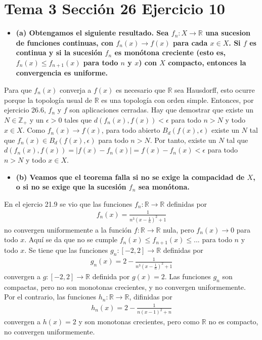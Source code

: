 \documentclass{article}
\begin{document}
\section{Tema 3 Sección 26 Ejercicio 10}
\begin{itemize}
\item \bf (a) \rm Obtengamos el siguiente resultado. Sea $f_n:X\rightarrow \mathbb{R}$ una sucesion de funciones continuas, con $f_n(x)\rightarrow f(x)$ para cada $x\in X$. Si $f$ es continua y si la sucesión $f_n$ es monótona creciente (esto es, $f_n(x)\leq f_{n+1}(x)$ para todo $n$ y $x$) con $X$ compacto, entonces la convergencia es uniforme.
\end{itemize}
Para que $f_n(x)$ converja a $f(x)$ es necesario que $\mathbb{R}$ sea Hausdorff, esto ocurre porque la topología usual de $\mathbb{R}$ es una topología con orden simple. Entonces, por ejercicio 26.6, $f_n$ y $f$ son aplicaciones cerradas. Hay que demostrar que existe un $N\in\mathbb{Z}_+$ y un $\epsilon>0$ tales que $d(f_n(x),f(x))<\epsilon$ para todo $n>N$ y todo $x\in X$. Como $f_n(x)\rightarrow f(x)$, para todo abierto $B_d(f(x),\epsilon )$ existe un $N$ tal que $f_n(x)\in B_d(f(x),\epsilon )$ para todo $n>N$. Por tanto, existe un $N$ tal que $d(f_n(x),f(x))=|f(x)-f_n(x)|=f(x)-f_n(x)<\epsilon$ para todo $n>N$ y todo $x\in X$.
\begin{itemize}
\item \bf (b) \rm Veamos que el teorema falla si no se exige la compacidad de $X$, o si no se exige que la sucesión $f_n$ sea monótona.
\end{itemize}
En el ejercio 21.9 se vio que las funciones $f_n:\mathbb{R}\rightarrow\mathbb{R}$ definidas por
\begin{eqnarray}
f_n(x)=\frac{1}{n^3\left(x-\frac{1}{n}\right)^2+1}
\end{eqnarray}
no convergen uniformemente a la función $f:\mathbb{R}\rightarrow\mathbb{R}$ nula, pero $f_n(x)\rightarrow 0$ para todo $x$. Aquí se da que no se cumple $f_n(x)\leq f_{n+1}(x)\leq ...$ para todo $n$ y todo $x$. Se tiene que las funciones $g_n:[-2,2]\rightarrow \mathbb{R}$ definidas por 
\begin{eqnarray}
g_n(x)=2-
\frac{1}{n^3\left(x-\frac{1}{n}\right)^2+1}\nonumber
\end{eqnarray}
convergen a $g:[-2,2]\rightarrow\mathbb{R}$ definida por $g(x)=2$. Las funciones $g_n$ son compactas, pero no son monotonas crecientes, y no convergen uniformemente. Por el contrario, las funciones $h_n:\mathbb{R}\rightarrow\mathbb{R}$, difinidas por 
\begin{eqnarray}
h_n(x)=2-
\frac{1}{n\left(x-1\right)^2+n}\nonumber
\end{eqnarray}
convergen a $h(x)=2$ y son monotonas crecientes, pero como $\mathbb{R}$ no es compacto, no convergen uniformemente.
\end{document}
